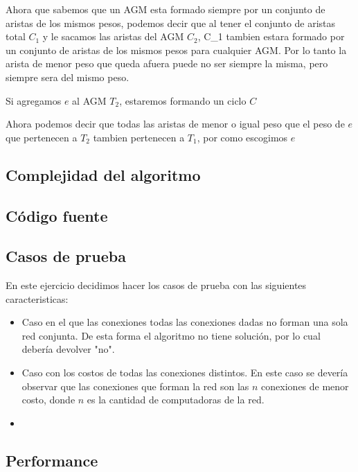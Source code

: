Ahora que sabemos que un AGM esta formado siempre por un conjunto de aristas de los mismos pesos, podemos decir que al tener el conjunto de aristas total $C_1$ y le sacamos las aristas del AGM $C_2$, C_1 tambien estara formado por un conjunto de aristas de los mismos pesos para cualquier AGM. Por lo tanto la arista de menor peso que queda afuera puede no ser siempre la misma, pero siempre sera del mismo peso.



Si agregamos $e$ al AGM $T_2$, estaremos formando un ciclo $C$

Ahora podemos decir que todas las aristas de menor o igual peso que el peso de $e$ que pertenecen a $T_2$ tambien pertenecen a $T_1$, por como escogimos $e$

\subsection{Complejidad del algoritmo}


\subsection{C\'odigo fuente}


\subsection{Casos de prueba}

En este ejercicio decidimos hacer los casos de prueba con las siguientes caracteristicas:

\begin{itemize}
\item Caso en el que las conexiones todas las conexiones dadas no forman una sola red conjunta. De esta forma el algoritmo no tiene solución, por lo cual debería devolver "no".
\item Caso con los costos de todas las conexiones distintos. En este caso se devería observar que las conexiones que forman la red son las $n$ conexiones de menor costo, donde $n$ es la cantidad de computadoras de la red.
\item 
\end{itemize}


\subsection{Performance}

